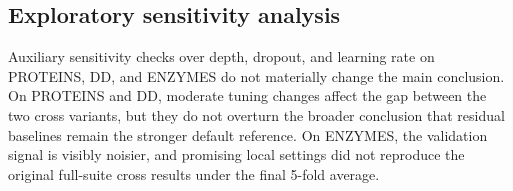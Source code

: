 \subsection*{Exploratory sensitivity analysis}

Auxiliary sensitivity checks over depth, dropout, and learning rate on PROTEINS, DD, and ENZYMES do not materially change the main conclusion. On PROTEINS and DD, moderate tuning changes affect the gap between the two cross variants, but they do not overturn the broader conclusion that residual baselines remain the stronger default reference. On ENZYMES, the validation signal is visibly noisier, and promising local settings did not reproduce the original full-suite cross results under the final 5-fold average.
